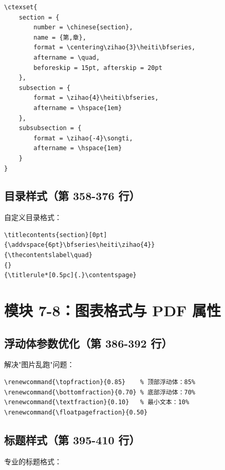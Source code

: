 \documentclass[linux]{hustreport}
\begin{document}
\begin{verbatim}
\ctexset{
    section = {
        number = \chinese{section},
        name = {第,章},
        format = \centering\zihao{3}\heiti\bfseries,
        aftername = \quad,
        beforeskip = 15pt, afterskip = 20pt
    },
    subsection = {
        format = \zihao{4}\heiti\bfseries,
        aftername = \hspace{1em}
    },
    subsubsection = {
        format = \zihao{-4}\songti,
        aftername = \hspace{1em}
    }
}
\end{verbatim}

\subsection{目录样式（第 358-376 行）}

自定义目录格式：

\begin{verbatim}
\titlecontents{section}[0pt]
{\addvspace{6pt}\bfseries\heiti\zihao{4}}
{\thecontentslabel\quad}
{}
{\titlerule*[0.5pc]{.}\contentspage}
\end{verbatim}

\newpage
\section{模块 7-8：图表格式与 PDF 属性}

\subsection{浮动体参数优化（第 386-392 行）}

解决"图片乱跑"问题：

\begin{verbatim}
\renewcommand{\topfraction}{0.85}    % 顶部浮动体：85%
\renewcommand{\bottomfraction}{0.70} % 底部浮动体：70%
\renewcommand{\textfraction}{0.10}   % 最小文本：10%
\renewcommand{\floatpagefraction}{0.50}
\end{verbatim}

\subsection{标题样式（第 395-410 行）}

专业的标题格式：
\end{document}
